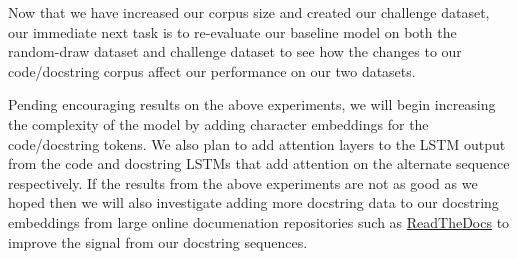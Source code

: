 \documentclass[article, 12pt, oneside]{memoir}
\begin{document}
Now that we have increased our corpus size and created our challenge
dataset, our immediate next task is to re-evaluate our baseline model on
both the random-draw dataset and challenge dataset to see how the
changes to our code/docstring corpus affect our performance on our two
datasets.

Pending encouraging results on the above experiments, we will begin
increasing the complexity of the model by adding character embeddings
for the code/docstring tokens. We also plan to add attention layers to
the LSTM output from the code and docstring LSTMs that add attention on
the alternate sequence respectively. If the results from the above
experiments are not as good as we hoped then we will also investigate
adding more docstring data to our docstring embeddings from large online
documenation repositories such as
\href{https://readthedocs.org/}{ReadTheDocs} to improve the signal from
our docstring sequences.
\end{document}
